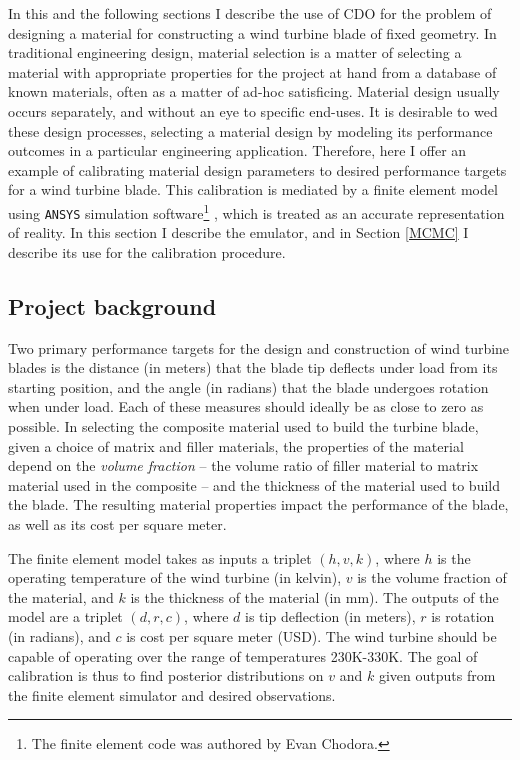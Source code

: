 \documentclass{article}
\begin{document}
In this and the following sections I describe the use of CDO for the problem of designing a material for constructing a wind turbine blade of fixed geometry. In traditional engineering design, material selection is a matter of selecting a material with appropriate properties for the project at hand from a database of known materials, often as a matter of ad-hoc satisficing. Material design usually occurs separately, and without an eye to specific end-uses. It is desirable to wed these design processes, selecting a material design by modeling its performance outcomes in a particular engineering application. Therefore, here I offer an example of calibrating material design parameters to desired performance targets for a wind turbine blade. This calibration is mediated by a finite element model using \texttt{ANSYS} simulation software\footnote{
The finite element code was authored by Evan Chodora.
}
, which is treated as an accurate representation of reality. In this section I describe the emulator, and in Section \ref{MCMC} I describe its use for the calibration procedure.

\subsection{Project background}

Two primary performance targets for the design and construction of wind turbine blades is the distance (in meters) that the blade tip deflects under load from its starting position, and the angle (in radians) that the blade undergoes rotation when under load. 
Each of these measures should ideally be as close to zero as possible.
In selecting the composite material used to build the turbine blade, given a choice of matrix and filler materials, the properties of the material depend on the \textit{volume fraction} -- the volume ratio of filler material to matrix material used in the composite -- and the thickness of the material used to build the blade. 
The resulting material properties impact the performance of the blade, as well as its cost per square meter. 

The finite element model takes as inputs a triplet $(h,v,k)$, where $h$ is the operating temperature of the wind turbine (in kelvin), $v$ is the volume fraction of the material, and $k$ is the thickness of the material (in mm). 
The outputs of the model are a triplet $(d,r,c)$, where $d$ is tip deflection (in meters), $r$ is rotation (in radians), and $c$ is cost per square meter (USD). 
The wind turbine should be capable of operating over the range of temperatures 230K-330K. The goal of calibration is thus to find posterior distributions on $v$ and $k$ given outputs from the finite element simulator and desired observations.
\end{document}
